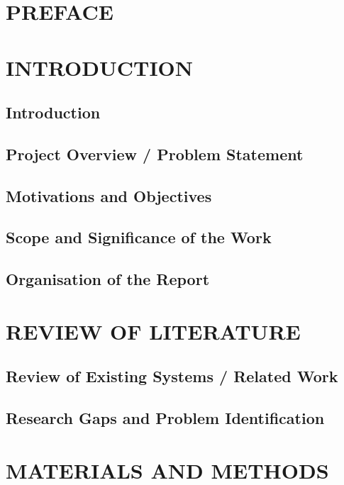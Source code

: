 \documentclass[12pt,a4paper]{report}
\begin{document}
\newpage
\chapter*{PREFACE}

\newpage
{}
\tableofcontents

\newpage
{}
\listoffigures

\newpage
{}
\listoftables


\newpage
{} 
\chapter{INTRODUCTION}
\section{Introduction}
\section{Project Overview / Problem Statement}
\section{Motivations and Objectives}
\section{Scope and Significance of the Work}
\section{Organisation of the Report}

\chapter{REVIEW OF LITERATURE}
\section{Review of Existing Systems / Related Work}
\section{Research Gaps and Problem Identification}


\chapter{MATERIALS AND METHODS}
\end{document}
